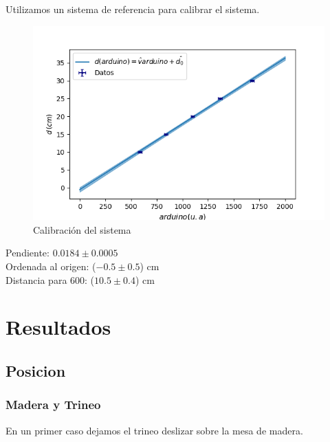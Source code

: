 \documentclass[12pt,a4]{article}
\begin{document}
Utilizamos un sistema de referencia para calibrar el sistema.

\begin{figure}[H]
    \centering
    \includegraphics[width=0.9\linewidth]{Calibracion.png}
    \caption{Calibración del sistema}
    \label{fig:calibracion}
\end{figure}

Pendiente: $0.0184 \pm 0.0005$ \\

Ordenada al origen: ($-0.5 \pm 0.5$) cm\\

Distancia para 600: ($10.5 \pm 0.4$) cm \\

\newpage

\section{Resultados}

\subsection{Posicion}

\subsubsection*{Madera y Trineo}

En un primer caso dejamos el trineo deslizar sobre la mesa de madera. \\
\end{document}
